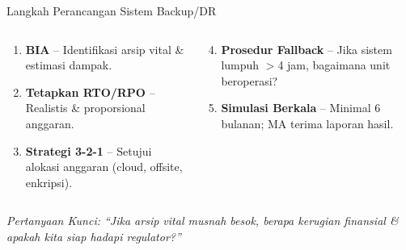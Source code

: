 \documentclass[aspectratio=169,11pt]{beamer}
\begin{document}
\begin{frame}{Langkah Perancangan Sistem Backup/DR}
    \vspace{0.2cm}
    \begin{columns}[T]
        \begin{premiumbox}
            \scriptsize
            \begin{enumerate}
                \item \textbf{BIA} -- Identifikasi arsip vital \& estimasi dampak.
                \item \textbf{Tetapkan RTO/RPO} -- Realistis \& proporsional anggaran.
                \item \textbf{Strategi 3-2-1} -- Setujui alokasi anggaran (cloud, offsite, enkripsi).
            \end{enumerate}
        \end{premiumbox}
        
        \begin{orangebox}
            \scriptsize
            \begin{enumerate}\setcounter{enumi}{3}
                \item \textbf{Prosedur Fallback} -- Jika sistem lumpuh $>$4 jam, bagaimana unit beroperasi?
                \item \textbf{Simulasi Berkala} -- Minimal 6 bulanan; MA terima laporan hasil.
            \end{enumerate}
        \end{orangebox}
    \end{columns}
    
    \vspace{0.2cm}
    \begin{center}
        \textcolor{plnblue}{\scriptsize\textit{Pertanyaan Kunci: ``Jika arsip vital musnah besok, berapa kerugian finansial \& apakah kita siap hadapi regulator?''}}
    \end{center}
\end{frame}
\end{document}
